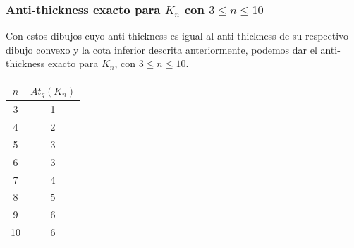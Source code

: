 \begin{frame}
\frametitle{Anti-thickness exacto para $K_n$ con $3 \leq n \leq 10$}
Con estos dibujos cuyo anti-thickness es igual al anti-thickness de su respectivo dibujo convexo y la cota inferior descrita anteriormente, podemos dar el anti-thickness exacto para $K_n$, con $3 \leq n \leq 10$.
\begin{table}
	\centering
\begin{tabular}{|c|c|}
	\hline 
	$n$ & $At_g(K_n)$ \\ \hline
	3   &  1 \\ \hline
	4   &  2 \\ \hline
	5   &  3 \\ \hline 
	6   &  3 \\ \hline 
	7   &  4 \\ \hline
	8   &  5 \\ \hline
	9   &  6 \\ \hline
	10  &  6 \\ \hline
\end{tabular}
\end{table}
\end{frame}